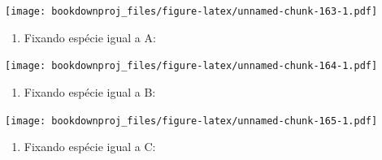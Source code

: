 \documentclass[
]{article}
\newenvironment{Shaded}{\begin{snugshade}}{\end{snugshade}}
\newcommand{\DataTypeTok}[1]{\textcolor[rgb]{0.13,0.29,0.53}{#1}}
\newcommand{\KeywordTok}[1]{\textcolor[rgb]{0.13,0.29,0.53}{\textbf{#1}}}
\newcommand{\NormalTok}[1]{#1}
\newcommand{\OperatorTok}[1]{\textcolor[rgb]{0.81,0.36,0.00}{\textbf{#1}}}
\newcommand{\StringTok}[1]{\textcolor[rgb]{0.31,0.60,0.02}{#1}}
\providecommand{\tightlist}{%
  \setlength{\itemsep}{0pt}\setlength{\parskip}{0pt}}
\begin{document}
\texttt{[image: bookdownproj\_files/figure-latex/unnamed-chunk-163-1.pdf]}

\begin{enumerate}
\def\labelenumi{\arabic{enumi}.}
\setcounter{enumi}{6}
\tightlist
\item
  Fixando espécie igual a A:
\end{enumerate}

\begin{Shaded}
\end{Shaded}

\texttt{[image: bookdownproj\_files/figure-latex/unnamed-chunk-164-1.pdf]}

\begin{enumerate}
\def\labelenumi{\arabic{enumi}.}
\setcounter{enumi}{7}
\tightlist
\item
  Fixando espécie igual a B:
\end{enumerate}

\begin{Shaded}
\end{Shaded}

\texttt{[image: bookdownproj\_files/figure-latex/unnamed-chunk-165-1.pdf]}

\begin{enumerate}
\def\labelenumi{\arabic{enumi}.}
\setcounter{enumi}{8}
\tightlist
\item
  Fixando espécie igual a C:
\end{enumerate}

\begin{Shaded}
\end{Shaded}
\end{document}

